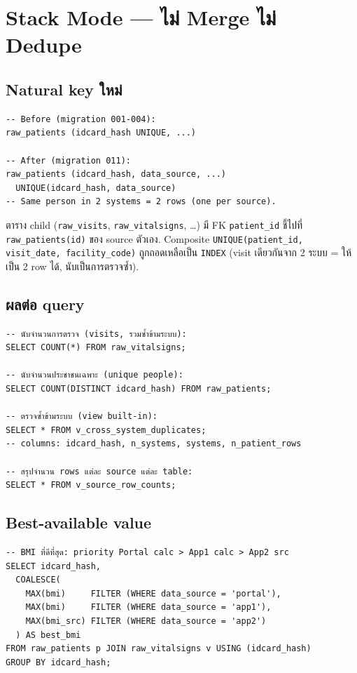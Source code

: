 \documentclass[11pt,a4paper]{article}
\begin{document}
\section{Stack Mode --- ไม่ Merge ไม่ Dedupe}

\subsection{Natural key ใหม่}

\begin{lstlisting}[style=sqlstyle]
-- Before (migration 001-004):
raw_patients (idcard_hash UNIQUE, ...)

-- After (migration 011):
raw_patients (idcard_hash, data_source, ...)
  UNIQUE(idcard_hash, data_source)
-- Same person in 2 systems = 2 rows (one per source).
\end{lstlisting}

ตาราง child (\texttt{raw\_visits}, \texttt{raw\_vitalsigns}, \ldots) มี FK \texttt{patient\_id}
ชี้ไปที่ \texttt{raw\_patients(id)} ของ source ตัวเอง.
Composite \texttt{UNIQUE(patient\_id, visit\_date, facility\_code)} ถูกถอดเหลือเป็น \texttt{INDEX}
(visit เดียวกันจาก 2 ระบบ = ให้เป็น 2 row ได้, นับเป็นการตรวจซ้ำ).

\subsection{ผลต่อ query}

\begin{lstlisting}[style=sqlstyle]
-- นับจำนวนการตรวจ (visits, รวมซ้ำข้ามระบบ):
SELECT COUNT(*) FROM raw_vitalsigns;

-- นับจำนวนประชาชนเฉพาะ (unique people):
SELECT COUNT(DISTINCT idcard_hash) FROM raw_patients;

-- ตรวจซ้ำข้ามระบบ (view built-in):
SELECT * FROM v_cross_system_duplicates;
-- columns: idcard_hash, n_systems, systems, n_patient_rows

-- สรุปจำนวน rows แต่ละ source แต่ละ table:
SELECT * FROM v_source_row_counts;
\end{lstlisting}

\subsection{Best-available value}

\begin{lstlisting}[style=sqlstyle]
-- BMI ที่ดีที่สุด: priority Portal calc > App1 calc > App2 src
SELECT idcard_hash,
  COALESCE(
    MAX(bmi)     FILTER (WHERE data_source = 'portal'),
    MAX(bmi)     FILTER (WHERE data_source = 'app1'),
    MAX(bmi_src) FILTER (WHERE data_source = 'app2')
  ) AS best_bmi
FROM raw_patients p JOIN raw_vitalsigns v USING (idcard_hash)
GROUP BY idcard_hash;
\end{lstlisting}
\end{document}
